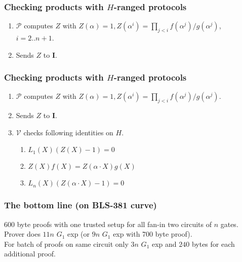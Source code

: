 \documentclass[shadesubsections,trans,14pt,mathserif]{beamer}
\newcommand{\ver}{\ensuremath{\mathcal{V}}}
\newcommand{\prv}{\ensuremath{\mathcal{P}}}
\newcommand{\ideal}{\mathbf{I}}
\newcommand{\gen}{\alpha}
\begin{document}
\begin{frame}
\frametitle{Checking products with $H$-ranged protocols}   %
 \begin{enumerate}
  \item $\prv$ computes $Z$ with 
  $ Z(\gen)=1, Z(\gen^i) = \prod_{j<i}  f(\gen^j)/g(\gen^j)$, {\small{$i=2..n+1$}}.
  \item Sends $Z$ to $\ideal$.

 \end{enumerate}


\end{frame}

\begin{frame}
\frametitle{Checking products with $H$-ranged protocols}   %
 \begin{enumerate}
  \item $\prv$ computes $Z$ with 
  $ Z(\gen)=1, Z(\gen^i) = \prod_{j<i}  f(\gen^j)/g(\gen^j)$.
  \item Sends $Z$ to $\ideal$.
  \item $\ver$ checks following identities on $H$.
  \begin{enumerate}
   \item $L_1(X) (Z(X)-1) =0$
   \item $Z(X) f(X) = Z(\gen\cdot X)g(X)$
 \item $L_n(X) (Z(\gen\cdot X) -1)=0$ 
 \end{enumerate}

 \end{enumerate}


\end{frame}




\begin{frame}
\frametitle{The bottom line {\normalsize{(on BLS-381 curve)}}}   %
 600 byte proofs with one trusted setup for all fan-in two circuits of $n$ gates.\\
  \vspace{0.2in}
Prover does $11n$ $G_1$ exp {\small{(or $9n$ $G_1$ exp with 700 byte proof)}}.\\
  \vspace{0.2in}
For batch of proofs on same circuit only $3n$ $G_1$ exp and $240$ bytes for each additional proof.
 

\end{frame}
\end{document}
